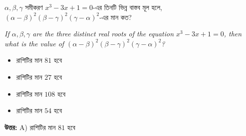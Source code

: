 \documentclass[12pt, a4paper]{article}
\begin{document}
\begin{tcolorbox}[questionbox={প্রশ্ন (Question) 30}]
    \noindent
    $\alpha, \beta, \gamma$ সমীকরণ $x^3 - 3x + 1 = 0$-এর তিনটি ভিন্ন বাস্তব মূল হলে, $(\alpha - \beta)^2(\beta - \gamma)^2(\gamma - \alpha)^2$-এর মান কত?
    
    \vspace{0.8em}
    \begin{english}
    \noindent\textit{\color{darkgray}
    If $\alpha, \beta, \gamma$ are the three distinct real roots of the equation $x^3 - 3x + 1 = 0$, then what is the value of $(\alpha - \beta)^2(\beta - \gamma)^2(\gamma - \alpha)^2$?
    }
    \end{english}
\end{tcolorbox}

\begin{itemize}[label={}, leftmargin=1cm, itemsep=0.5em]
    \item[\textbf{A)}] রাশিটির মান $81$ হবে
    \item[\textbf{B)}] রাশিটির মান $27$ হবে
    \item[\textbf{C)}] রাশিটির মান $108$ হবে
    \item[\textbf{D)}] রাশিটির মান $54$ হবে
\end{itemize}

\vspace{0.5em}
\begin{tcolorbox}[answerbox]
    \textbf{\color{success} উত্তর:} A) রাশিটির মান $81$ হবে
\end{tcolorbox}
\vspace{1em}
\end{document}
